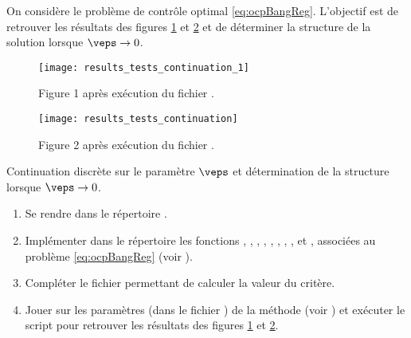 
On consid\`ere le probl\`eme de contr\^ole optimal \eqref{eq:ocpBangReg}. L'objectif est de retrouver les r\'esultats des figures
\ref{fig:results_tests_continuation_1} et \ref{fig:results_tests_continuation} et de d\'eterminer la structure de la solution lorsque $\veps \to 0$.

\begin{figure}[ht!]
    \begin{center}
        \texttt{[image: results\_tests\_continuation\_1]}
    \end{center}
    \vspace{-3em}
    \caption{Figure 1 apr\`es ex\'ecution du fichier .}
    \label{fig:results_tests_continuation_1}
\end{figure}

\begin{figure}[ht!]
    \begin{center}
        \texttt{[image: results\_tests\_continuation]}
    \end{center}
    \vspace{-3em}
    \caption{Figure 2 apr\`es ex\'ecution du fichier .}
    \label{fig:results_tests_continuation}
\end{figure}

\begin{myExercice} Continuation discr\`ete sur le param\`etre $\veps$ et d\'etermination de la structure lorsque $\veps \to 0$.
    \begin{enumerate}
        \item Se rendre dans le r\'epertoire .
        \item Impl\'ementer dans le r\'epertoire  les fonctions , , , , 
            , , , ,  et ,
            associ\'ees au probl\`eme \eqref{eq:ocpBangReg} (voir ).
        \item Compl\'eter le fichier  permettant de calculer la valeur du crit\`ere.
        \item Jouer sur les param\`etres (dans le fichier ) de la m\'ethode  (voir )
            et ex\'ecuter le script  pour retrouver les r\'esultats des figures
            \ref{fig:results_tests_continuation_1} et \ref{fig:results_tests_continuation}.
    \end{enumerate}
\end{myExercice}

